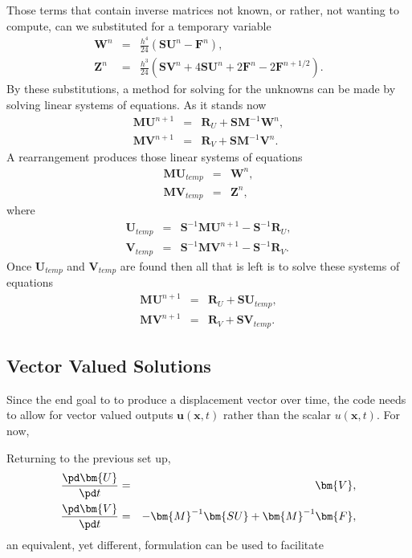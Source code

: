 Those terms that contain inverse matrices not known, or rather, not wanting to compute, can we substituted for a temporary variable
\begin{eqnarray*}
  \bm{W}^n & = & \frac{h^4}{24}(\bm{SU}^n - \bm{F}^n), \\
  \bm{Z}^n & = & \frac{h^3}{24}(\bm{SV}^n + 4\bm{SU}^n + 2\bm{F}^n - 2\bm{F}^{n+1/2}).
\end{eqnarray*}
By these substitutions, a method for solving for the unknowns can be made by solving linear systems of equations. As it stands now
\begin{eqnarray*}
  \bm{MU}^{n+1} & = & \bm{R}_U + \bm{SM}^{-1}\bm{W}^n, \\
  \bm{MV}^{n+1} & = & \bm{R}_V + \bm{SM}^{-1}\bm{V}^n.
\end{eqnarray*}
A rearrangement produces those linear systems of equations
\begin{eqnarray*}
  \bm{M}\bm{U}_{temp} & = & \bm{W}^n, \\
  \bm{M}\bm{V}_{temp} & = & \bm{Z}^n,
\end{eqnarray*}
where
\begin{eqnarray*}
  \bm{U}_{temp} & = & \bm{S}^{-1}\bm{MU}^{n+1} - \bm{S}^{-1}\bm{R}_U, \\
  \bm{V}_{temp} & = & \bm{S}^{-1}\bm{MV}^{n+1} - \bm{S}^{-1}\bm{R}_V.
\end{eqnarray*}
Once $\bm{U}_{temp}$ and $\bm{V}_{temp}$ are found then all that is left is to solve these systems of equations
\begin{eqnarray*}
  \bm{MU}^{n+1} & = & \bm{R}_U + \bm{SU}_{temp}, \\
  \bm{MV}^{n+1} & = & \bm{R}_V + \bm{SV}_{temp}.
\end{eqnarray*}

\subsection{Vector Valued Solutions}
Since the end goal to to produce a displacement vector over time, the code needs to allow for vector valued outputs $\bm{u}(\bm{x},t)$ rather than the scalar $u(\bm{x},t)$. For now, 

Returning to the previous set up,
\begin{eqnarray*}
  \frac{\pd\bm{U}}{\pd t} & = & \bm{V}, \\
  \frac{\pd\bm{V}}{\pd t} & = & -\bm{M}^{-1}\bm{SU} + \bm{M}^{-1}\bm{F},
\end{eqnarray*}
an equivalent, yet different, formulation can be used to facilitate
